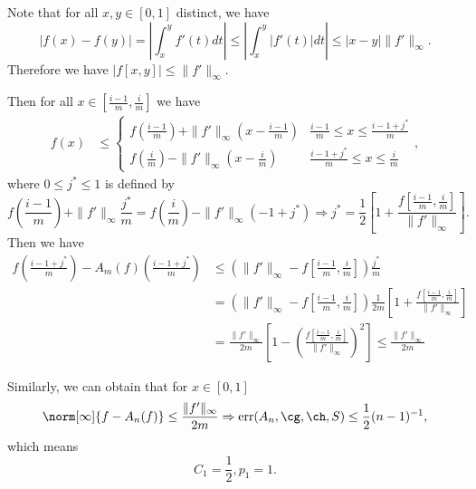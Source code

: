  Note that for all $x,y \in [0,1]$ distinct, we have
 $$|f(x)-f(y)|=\left|\int_{x}^{y}f'(t)dt\right|\leq \left|\int_{x}^{y}\left|f'(t)\right|dt\right|
 \leq |x-y|\|f'\|_{\infty}.$$
 Therefore we have $|f[x,y]|\leq \|f'\|_{\infty}.$

  Then for all $x \in \left[\frac{i-1}{m},\frac{i}{m}\right]$ we have
  \begin{align*}
  f(x)
  & \leq \left\{\begin{matrix}
  f\left(\frac{i-1}{m}\right)+\|f'\|_{\infty}\left(x-\frac{i-1}{m}\right) & \frac{i-1}{m} \leq x \leq \frac{i-1+j^{*}}{m} \\
  f\left(\frac{i}{m}\right)-\|f'\|_{\infty}\left(x-\frac{i}{m}\right) & \frac{i-1+j^{*}}{m} \leq x \leq \frac{i}{m}
  \end{matrix},\right.
  \end{align*}
where $0 \leq j^{*} \leq 1$ is defined by
$$f\left(\frac{i-1}{m}\right)+\|f'\|_{\infty}\frac{j^{*}}{m}=f\left(\frac{i}{m}\right)-\|f'\|_{\infty}\left(-1+j^{*}\right)
\Rightarrow j^{*}=\frac{1}{2}\left[1+\frac{f\left[\frac{i-1}{m},\frac{i}{m}\right]}{\|f'\|_{\infty}}\right].$$
Then we have
\begin{align*}
f\left(\frac{i-1+j^{*}}{m}\right)-A_{m}(f)\left(\frac{i-1+j^{*}}{m}\right) &
\leq \left(\|f'\|_{\infty}-f\left[\frac{i-1}{m},\frac{i}{m}\right]\right)\frac{j^{*}}{m}\\
& =\left(\|f'\|_{\infty}-f\left[\frac{i-1}{m},\frac{i}{m}\right]\right)\frac{1}{2m}\left[1+\frac{f\left[\frac{i-1}{m},\frac{i}{m}\right]}{\|f'\|_{\infty}}\right]\\
& =\frac{\|f'\|_{\infty}}{2m}\left[1-\left(\frac{f\left[\frac{i-1}{m},\frac{i}{m}\right]}{\|f'\|_{\infty}}\right)^{2}\right]\leq \frac{\|f'\|_{\infty}}{2m}
\end{align*}

Similarly, we can obtain that for $x \in [0,1]$
\begin{equation}\label{errorg}\norm[\infty]{f-A_{n}(f)} \leq \frac{\|f'\|_{\infty}}{2m} \Rightarrow \err(A_n,\cg,\ch,S) \leq \frac{1}{2}(n-1)^{-1},
\end{equation}
which means
$$C_{1}=\frac{1}{2},p_{1}=1.$$

